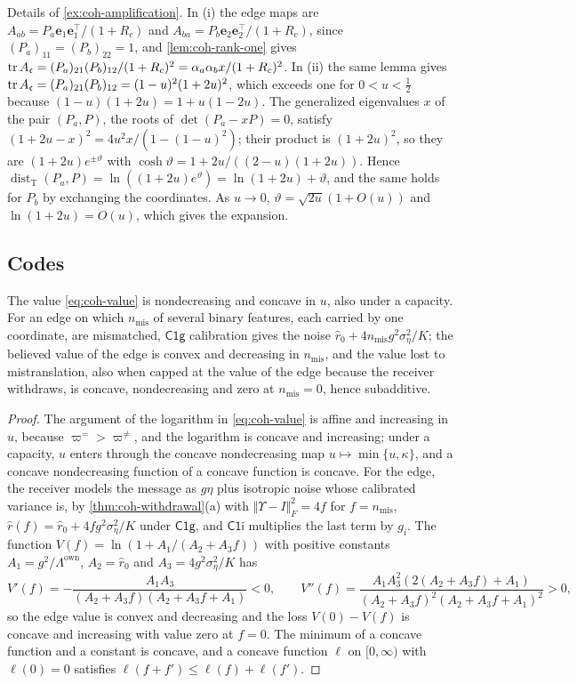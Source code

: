 Details of \cref{ex:coh-amplification}. In (i) the edge maps are $A_{ab}=P_a\bm e_1\bm e_1^\top/(1+R_c)$ and $A_{ba}=P_b\bm e_2\bm e_2^\top/(1+R_c)$, since $(P_a)_{11}=(P_b)_{22}=1$, and \cref{lem:coh-rank-one} gives $\operatorname{tr} A_{\mathfrak c}=(P_a)_{21}(P_b)_{12}/(1+R_c)^2=\alpha_a\alpha_bx/(1+R_c)^2$. In (ii) the same lemma gives $\operatorname{tr} A_{\mathfrak c}=(P_a)_{21}(P_b)_{12}=(1-u)^2(1+2u)^2$, which exceeds one for $0<u<\frac12$ because $(1-u)(1+2u)=1+u(1-2u)$. The generalized eigenvalues $x$ of the pair $(P_a,P)$, the roots of $\det(P_a-xP)=0$, satisfy $(1+2u-x)^2=4u^2x/(1-(1-u)^2)$; their product is $(1+2u)^2$, so they are $(1+2u)e^{\pm\vartheta}$ with $\cosh\vartheta=1+2u/((2-u)(1+2u))$. Hence $\operatorname{dist}_{\mathrm T}(P_a,P)=\ln((1+2u)e^\vartheta)=\ln(1+2u)+\vartheta$, and the same holds for $P_b$ by exchanging the coordinates. As $u\to0$, $\vartheta=\sqrt{2u}(1+O(u))$ and $\ln(1+2u)=O(u)$, which gives the expansion.

\subsection{Codes}\label{app:coh-codes}

\begin{lemma}\label{lem:coh-c1-value}
The value \eqref{eq:coh-value} is nondecreasing and concave in $u$, also under a capacity. For an edge on which $n_{\mathrm{mis}}$ of several binary features, each carried by one coordinate, are mismatched, $\mathsf{C1g}$ calibration gives the noise $\hat r_0+4n_{\mathrm{mis}}g^2\sigma_\eta^2/K$; the believed value of the edge is convex and decreasing in $n_{\mathrm{mis}}$, and the value lost to mistranslation, also when capped at the value of the edge because the receiver withdraws, is concave, nondecreasing and zero at $n_{\mathrm{mis}}=0$, hence subadditive.
\end{lemma}

\begin{proof}
The argument of the logarithm in \eqref{eq:coh-value} is affine and increasing in $u$, because $\varpi^{=}>\varpi^{\neq}$, and the logarithm is concave and increasing; under a capacity, $u$ enters through the concave nondecreasing map $u\mapsto\min\{u,\kappa\}$, and a concave nondecreasing function of a concave function is concave. For the edge, the receiver models the message as $g\eta$ plus isotropic noise whose calibrated variance is, by \cref{thm:coh-withdrawal}(a) with $\Vert\Upsilon-I\Vert_F^2=4f$ for $f=n_{\mathrm{mis}}$, $\hat r(f)=\hat r_0+4fg^2\sigma_\eta^2/K$ under $\mathsf{C1g}$, and $\mathsf{C1i}$ multiplies the last term by $g_i$. The function $V(f)=\ln(1+A_1/(A_2+A_3f))$ with positive constants $A_1=g^2/\Lambda^{\mathrm{own}}$, $A_2=\hat r_0$ and $A_3=4g^2\sigma_\eta^2/K$ has
\[ V'(f)=-\frac{A_1A_3}{(A_2+A_3f)(A_2+A_3f+A_1)}<0,\qquad V''(f)=\frac{A_1A_3^2(2(A_2+A_3f)+A_1)}{(A_2+A_3f)^2(A_2+A_3f+A_1)^2}>0, \]
so the edge value is convex and decreasing and the loss $V(0)-V(f)$ is concave and increasing with value zero at $f=0$. The minimum of a concave function and a constant is concave, and a concave function $\ell$ on $[0,\infty)$ with $\ell(0)=0$ satisfies $\ell(f+f')\le\ell(f)+\ell(f')$.
\end{proof}

